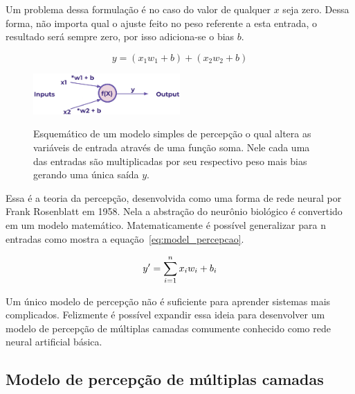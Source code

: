             Um problema dessa formulação é no caso do valor de qualquer $x$ seja zero. Dessa forma, não importa qual o ajuste feito no peso referente a esta entrada, o resultado será sempre zero, por isso adiciona-se o bias $b$.
            
            \begin{equation*}
                y = (x_{1}w_{1} + b) + (x_{2}w_{2} + b)
            \end{equation*}
            
            \begin{figure}[H]
                \centering
                \caption{Esquemático de um modelo simples de percepção o qual altera as variáveis de entrada através de uma função soma. Nele cada uma das entradas são multiplicadas por seu respectivo peso mais bias gerando uma única saída $y$.}
                \includegraphics[width=0.5\textwidth]{fig/2-fundamentacao/model_perceptron/adicionar_bias.png}
                \fonte{}
                \label{fig:entrada_neuronio_saida}
            \end{figure}
            
            Essa é a teoria da percepção, desenvolvida como uma forma de rede neural por Frank Rosenblatt em 1958. Nela a abstração do neurônio biológico é convertido em um modelo matemático. Matematicamente é possível generalizar para n entradas como mostra a equação~\ref{eq:model_percepcao}.
            
            \begin{equation}
                \centering
                y' =  \sum_{i = 1}^{n} x_{i}w_{i} + b_{i}
                \label{eq:model_percepcao}
            \end{equation}
            
            Um único modelo de percepção não é suficiente para aprender sistemas mais complicados. Felizmente é possível expandir essa ideia para desenvolver um modelo de percepção de múltiplas camadas comumente conhecido como rede neural artificial básica.
        
        \subsection{Modelo de percepção de múltiplas camadas}
            
